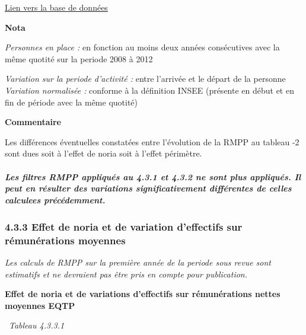 \href{../Bases/Remunerations/Anavar.synthese.csv}{Lien vers la base de
données}

\textbf{Nota}

\emph{Personnes en place :} en fonction au moins deux années
consécutives avec la même quotité sur la periode 2008 à 2012

\emph{Variation sur la periode d'activité :} entre l'arrivée et le
départ de la personne\\
\emph{Variation normalisée :} conforme à la définition INSEE (présente
en début et en fin de période avec la même quotité)

\textbf{Commentaire}

Les différences éventuelles constatées entre l'évolution de la RMPP au
tableau -2 sont dues soit à l'effet de noria soit à l'effet périmètre.

\hypertarget{les-filtres-rmpp-appliques-au-4.3.1-et-4.3.2-ne-sont-plus-appliques.-il-peut-en-resulter-des-variations-significativement-differentes-de-celles-calculees-precedemment.}{%
\subparagraph{Les filtres RMPP appliqués au 4.3.1 et 4.3.2 ne sont plus
appliqués. Il peut en résulter des variations significativement
différentes de celles calculees
précédemment.}\label{les-filtres-rmpp-appliques-au-4.3.1-et-4.3.2-ne-sont-plus-appliques.-il-peut-en-resulter-des-variations-significativement-differentes-de-celles-calculees-precedemment.}}

\hypertarget{effet-de-noria-et-de-variation-deffectifs-sur-remunerations-moyennes}{%
\subsubsection{4.3.3 Effet de noria et de variation d'effectifs sur
rémunérations
moyennes}\label{effet-de-noria-et-de-variation-deffectifs-sur-remunerations-moyennes}}

\emph{Les calculs de RMPP sur la première année de la periode sous revue
sont estimatifs et ne devraient pas être pris en compte pour
publication.}

\textbf{Effet de noria et de variations d'effectifs sur rémunérations
nettes moyennes EQTP}

~\emph{Tableau 4.3.3.1}

